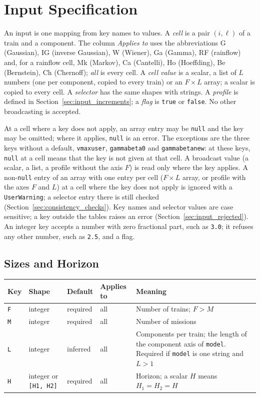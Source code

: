 \documentclass[11pt,a4paper]{article}
\makeatletter
\theoremstyle{plain}
\theoremstyle{definition}
\renewcommand{\_}{\textunderscore\allowbreak{}}
\providecommand{\keyrow}[5]{{\raggedright #1\par} & {\raggedright #2\par} & {\raggedright #3\par} & {\raggedright #4\par} & {\raggedright #5\par} \\}
\providecommand{\tabstart}[2]{\begingroup\small\begin{longtable}{@{}#1@{}}\toprule #2 \\ \midrule \endhead}
\providecommand{\tabend}{\bottomrule\end{longtable}\endgroup}
\providecommand{\keytab}{\tabstart{p{3.2cm}p{2.2cm}p{1.8cm}p{1.9cm}p{4.5cm}}{Key & Shape & Default & Applies to & Meaning}}
\makeatother
\begin{document}
\endgroup

\section{Input Specification}\label{sec:inputs}

An input is one mapping from key names to values.
A \emph{cell} is a pair $(i,\ell)$ of a train and a component.
The column \emph{Applies to} uses the abbreviations G (Gaussian), IG (inverse Gaussian), W (Wiener), Ga (Gamma), RF (rainflow) and, for a rainflow cell, Mk (Markov), Ca (Cantelli), Ho (Hoeffding), Be (Bernstein), Ch (Chernoff); \emph{all} is every cell.
A \emph{cell value} is a scalar, a list of $L$ numbers (one per component, copied to every train) or an $F \times L$ array; a scalar is copied to every cell.
A \emph{selector} has the same shapes with strings.
A \emph{profile} is defined in Section~\ref{sec:input_increments}; a \emph{flag} is \texttt{true} or \texttt{false}.
No other broadcasting is accepted.

At a cell where a key does not apply, an array entry may be \texttt{null} and the key may be omitted; where it applies, \texttt{null} is an error.
The exceptions are the three keys without a default, \texttt{v\_max\_user}, \texttt{gamma\_beta\_0} and \texttt{gamma\_beta\_new}: at these keys, \texttt{null} at a cell means that the key is not given at that cell.
A broadcast value (a scalar, a list, a profile without the axis $F$) is read only where the key applies.
A non-\texttt{null} entry of an array with one entry per cell ($F \times L$ array, or profile with the axes $F$ and $L$) at a cell where the key does not apply is ignored with a \texttt{UserWarning}; a selector entry there is still checked (Section~\ref{sec:consistency_checks}).
Key names and selector values are case sensitive; a key outside the tables raises an error (Section~\ref{sec:input_rejected}).
An integer key accepts a number with zero fractional part, such as \texttt{3.0}; it refuses any other number, such as \texttt{2.5}, and a flag.

\subsection{Sizes and Horizon}\label{sec:input_scalars}

\keytab
\keyrow{\texttt{F}}{integer}{required}{all}{Number of trains; $F > M$}
\keyrow{\texttt{M}}{integer}{required}{all}{Number of missions}
\keyrow{\texttt{L}}{integer}{inferred}{all}{Components per train; the length of the component axis of \texttt{model}. Required if \texttt{model} is one string and $L > 1$}
\keyrow{\texttt{H}}{integer or \texttt{[H1, H2]}}{required}{all}{Horizon; a scalar $H$ means $H_1 = H_2 = H$}
\tabend
\end{document}

